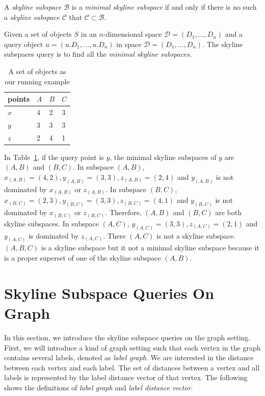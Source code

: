 \begin{definition}
A \emph{skyline subspace} $\mathcal{B}$ is a \emph{minimal skyline subspace} if and only if there is no such a \emph{skyline subspace} $\mathcal{C}$ that $\mathcal{C} \subset \mathcal{B}$.
\end{definition}

\begin{definition}
Given a set of objects $S$ in an $n$-dimensional space $\mathcal{D} = (D_1,\dots,D_n)$ and a query object $u = (u.D_1,\dots,u.D_n)$ in space $\mathcal{D} = (D_1,\dots,D_n)$. The skyline subspaces query is to find all the \emph{minimal skyline subspaces}.
\end{definition}

\begin{table}[t]
    \centering
    \begin{tabular}{|l|l|l|l|}
    \hline
    points & $A$ & $B$ & $C$ \\ \hline
    $x$      & 4 & 2 & 3 \\ \hline
    $y$      & 3 & 3 & 3 \\ \hline
    $z$      & 2 & 4 & 1 \\ \hline
    \end{tabular}
    \caption{\label{font-table} A set of objects as our running example }
    \label{tab:objects_example}
\end{table}

In Table~\ref{tab:objects_example}, if the query point is $y$, the minimal skyline subspaces of $y$ are $(A, B)$ and $(B, C)$. In subspace $(A, B)$, $x_{(A, B)} = (4, 2), y_{(A, B)} = (3, 3), z_{(A, B)} = (2, 4)$ and $y_{(A, B)}$ is not dominated by $x_{(A, B)}$ or $z_{(A, B)}$. 
In subspace $(B, C)$, $x_{(B, C)} = (2, 3), y_{(B, C)} = (3, 3), z_{(B, C)} = (4, 1)$ and $y_{(B, C)}$ is not dominated by $x_{(B, C)}$ or $z_{(B, C)}$. Therefore, $(A, B)$ and $(B, C)$ are both skyline subspaces. 
In subspace $(A, C)$, $y_{(A, C)} = (3, 3), z_{(A, C)} = (2, 1)$ and $y_{(A, C)}$ is dominated by $z_{(A, C)}$. There $(A, C)$ is not a skyline subspace. 
$(A, B, C)$ is a skyline subspace but it not a minimal skyline subspace because it is a proper superset of one of the skyline subspace $(A, B)$.

\section{Skyline Subspace Queries On Graph}
In this section, we introduce the skyline subspace queries on the graph setting. First, we will introduce a kind of graph setting such that each vertex in the graph contains several labels, denoted as \emph{label graph}. We are interested in the distance between each vertex and each label. The set of distances between a vertex and all labels is represented by the label distance vector of that vertex. The following shows the definitions of \emph{label graph} and \emph{label distance vector}.

